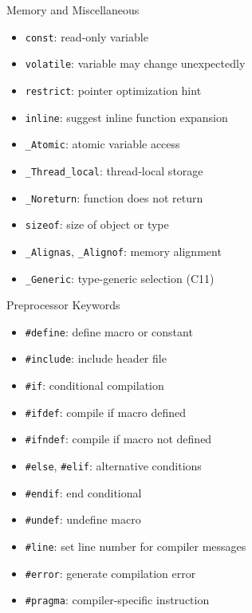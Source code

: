 \documentclass[12pt, aspectratio=169]{beamer}
\begin{document}
    \begin{frame}{Memory and Miscellaneous}
        \begin{itemize}
            \item \texttt{const}: read-only variable
            \item \texttt{volatile}: variable may change unexpectedly
            \item \texttt{restrict}: pointer optimization hint
            \item \texttt{inline}: suggest inline function expansion
            \item \texttt{\_Atomic}: atomic variable access
            \item \texttt{\_Thread\_local}: thread-local storage
            \item \texttt{\_Noreturn}: function does not return
            \item \texttt{sizeof}: size of object or type
            \item \texttt{\_Alignas}, \texttt{\_Alignof}: memory alignment
            \item \texttt{\_Generic}: type-generic selection (C11)
        \end{itemize}
    \end{frame}


    \begin{frame}{Preprocessor Keywords}
        \begin{itemize}
            \item \texttt{\#define}: define macro or constant
            \item \texttt{\#include}: include header file
            \item \texttt{\#if}: conditional compilation
            \item \texttt{\#ifdef}: compile if macro defined
            \item \texttt{\#ifndef}: compile if macro not defined
            \item \texttt{\#else}, \texttt{\#elif}: alternative conditions
            \item \texttt{\#endif}: end conditional
            \item \texttt{\#undef}: undefine macro
            \item \texttt{\#line}: set line number for compiler messages
            \item \texttt{\#error}: generate compilation error
            \item \texttt{\#pragma}: compiler-specific instruction
        \end{itemize}
    \end{frame}
\end{document}

